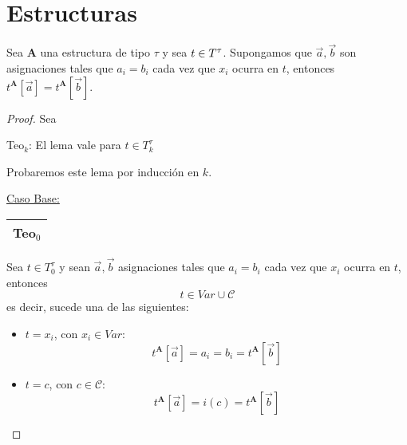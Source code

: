 \section{Estructuras}

  \begin{lemma} \label{lemma_43}
    \PN Sea $\mathbf{A}$ una estructura de tipo $\tau$ y sea $t \in T^{\tau}$. Supongamos que $\vec{a}, \vec{b}$ son
    asignaciones tales que $a_{i} = b_{i}$ cada vez que $x_{i}$ ocurra en $t$, entonces $t^{\mathbf{A}}[\vec{a}] =
    t^{\mathbf{A}}[\vec{b}]$.
  \end{lemma}
  \begin{proof}
    \PN Sea
    \begin{center}
      Teo$_{k}$: El lema vale para $t \in T_{k}^{\tau}$
    \end{center}
    \PN Probaremos este lema por inducción en $k$.

    \vspace{3mm}
    \PN \underline{Caso Base:} \begin{tabular}{|c|} \hline Teo$_{0}$ \\\hline \end{tabular} Sea $t \in T_{0}^{\tau}$ y
    sean $\vec{a}, \vec{b}$ asignaciones tales que $a_{i} = b_{i}$ cada vez que $x_{i}$ ocurra en $t$, entonces
    \[
      t \in Var \cup \mathcal{C}
    \]
    \PN es decir, sucede una de las siguientes:
    \begin{itemize}
      \item $t = x_{i}$, con $x_{i} \in Var$:
        \[
          t^{\mathbf{A}}[\vec{a}] = a_{i} = b_{i} = t^{\mathbf{A}}[\vec{b}]
        \]
      \item $t = c$, con $c \in \mathcal{C}$:
        \[
          t^{\mathbf{A}}[\vec{a}] = i(c) = t^{\mathbf{A}}[\vec{b}]
        \]
    \end{itemize}


\end{proof}
